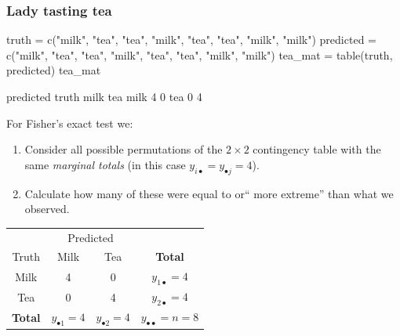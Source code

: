 \documentclass[a4paper]{article}\usepackage[]{graphicx}\usepackage[]{xcolor}
\begin{document}
\subsubsection{Lady tasting tea}
\begin{Schunk}
\begin{Sinput}
truth = c("milk", "tea", "tea", "milk", "tea", "tea", "milk", "milk")
predicted = c("milk", "tea", "tea", "milk", "tea", "tea", "milk", "milk")
tea_mat = table(truth, predicted)
tea_mat
\end{Sinput}
\begin{Soutput}
      predicted
truth  milk tea
  milk    4   0
  tea     0   4
\end{Soutput}
\end{Schunk}
For Fisher's exact test we:
\begin{enumerate}
	\item Consider all possible permutations of the  \( 2 \times 2 \) contingency table with the same \textit{marginal totals} (in this case \( y_{i\bullet} = y_{\bullet j} = 4 \)).
	\item Calculate how many of these were equal to or`` more extreme'' than what we observed.
\end{enumerate}
\begin{table}[H]
	\centering
	\begin{tabular}{@{}c|cc|c@{}}
	\toprule
				   & \multicolumn{2}{c|}{Predicted}                  & \\
	Truth          & Milk                   & Tea                    & \textbf{Total}                   \\ \midrule
	Milk           & 4                      & 0                      & \( y_{1\bullet} = 4 \)           \\
	Tea            & 0                      & 4                      & \( y_{2\bullet} = 4 \)           \\ \midrule
	\textbf{Total} & \( y_{\bullet1} = 4 \) & \( y_{\bullet2} = 4 \) & \( y_{\bullet\bullet} = n = 8 \) \\ \bottomrule
	\end{tabular}
\end{table}
\end{document}
